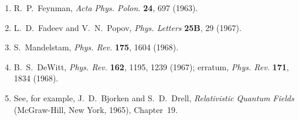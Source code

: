 \begin{enumerate}
  \item {}\label{ch10-ref-30}
  R.~P.~Feynman, \emph{Acta Phys. Polon.} \textbf{24}, 697 (1963).

  \item {}\label{ch10-ref-31}
  L.~D.~Fadeev and V.~N.~Popov, \emph{Phys. Letters} \textbf{25B},
  29 (1967).

  \item {}\label{ch10-ref-32}
  S.~Mandelstam, \emph{Phys. Rev.} \textbf{175}, 1604 (1968).

  \item {}\label{ch10-ref-33}
  B.~S.~DeWitt, \emph{Phys. Rev.} \textbf{162}, 1195, 1239 (1967);
  erratum, \emph{Phys. Rev.} \textbf{171}, 1834 (1968).

  \item {}\label{ch10-ref-34}
  See, for example, J.~D.~Bjorken and S.~D.~Drell,
  \emph{Relativistic Quantum Fields} (McGraw-Hill, New York, 1965),
  Chapter~19.
\end{enumerate}
